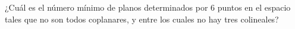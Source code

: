 ¿Cuál es el número mínimo de planos determinados por $6$ puntos en el espacio tales que no son todos coplanares, y entre los cuales no hay tres colineales? 
